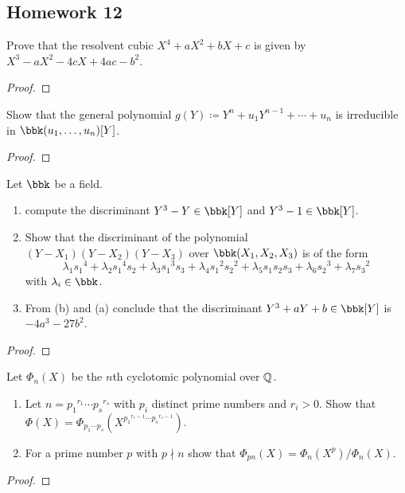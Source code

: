 \subsection{Homework 12}
\begin{problem}
  Prove that the resolvent cubic $X^4+aX^2+bX+c$ is given by
  $X^3-aX^2-4cX+4ac-b^2$.
\end{problem}
\begin{proof}
\end{proof}

\begin{problem}
  Show that the general polynomial $g(Y)\coloneq Y^n+u_1Y^{n-1}+\dotsb+u_n$
  is irreducible in $\bbk(u_1,\dotsc,u_n)[Y]$.
\end{problem}
\begin{proof}
\end{proof}

\begin{problem}
  Let $\bbk$ be a field.
  \begin{enumerate}[label=(\alph*),noitemsep]
  \item compute the discriminant $Y^3-Y\in\bbk[Y]$ and $Y^3-1\in\bbk[Y]$.
  \item Show that the discriminant of the polynomial
    $(Y-X_1)(Y-X_2)(Y-X_3)$ over $\bbk(X_1,X_2,X_3)$ is of the form
    \[
      \lambda_1{s_1}^4+\lambda_2{s_1}^4s_2+\lambda_3{s_1}^3s_3+\lambda_4{s_1}^2{s_2}^2+\lambda_5s_1s_2s_3+\lambda_6{s_2}^3+\lambda_7{s_3}^2
    \]
    with $\lambda_i\in\bbk$.
  \item From (b) and (a) conclude that the discriminant
    $Y^3+aY+b\in\bbk[Y]$ is $-4a^3-27b^2$.
\end{enumerate}
\end{problem}
\begin{proof}
\end{proof}

\begin{problem}
  Let $\Phi_n(X)$ be the $n$th cyclotomic polynomial over $\mathbb{Q}$.
  \begin{enumerate}[label=(\alph*),noitemsep]
  \item Let $n={p_1}^{r_1}\dotsm{p_s}^{r_s}$ with $p_i$ distinct prime
    numbers and $r_i>0$. Show that
    $\Phi(X)=\Phi_{p_1\dotsm p_s}(X^{{p_1}^{r_1-1}\dotsm{p_s}^{r_s-1}})$.
  \item For a prime number $p$ with $p\nmid n$ show that
    $\Phi_{pn}(X)=\Phi_n(X^p)/\Phi_n(X)$.
  \end{enumerate}
\end{problem}
\begin{proof}
\end{proof}

